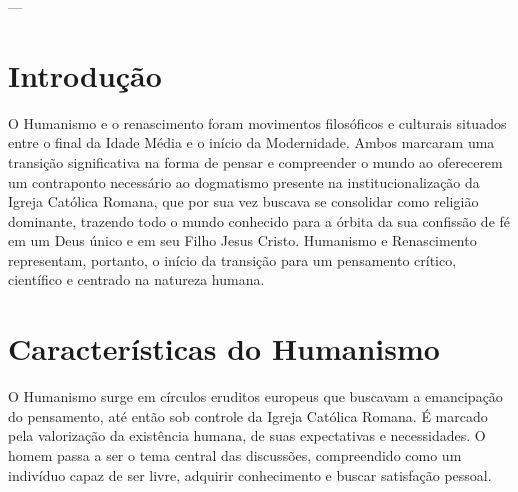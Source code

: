 \documentclass[
    article,            %
	12pt,				%
	oneside,			%
	a4paper,			%
	chapter=TITLE,		%
	section=TITLE,		%
	subsection=TITLE,	%
	english,			%
	french,				%
	spanish,			%
	brazil				%
	]{abntex2}
\begin{document}



\imprimircapa

\imprimirfolhaderosto

---
\tableofcontents*
\cleardoublepage

\textual
\pagestyle{simple}


\section{Introdução}
O Humanismo e o renascimento foram movimentos filosóficos e culturais situados entre o final da Idade Média e o início da Modernidade. Ambos marcaram uma transição significativa na forma de pensar e compreender o mundo ao oferecerem um contraponto necessário ao dogmatismo presente na institucionalização da Igreja Católica Romana, que por sua vez buscava se consolidar como religião dominante, trazendo todo o mundo conhecido para a órbita da sua confissão de fé em um Deus único e em seu Filho Jesus Cristo. Humanismo e Renascimento representam, portanto, o início da transição para um pensamento crítico, científico e centrado na natureza humana.

\section{Características do Humanismo}
O Humanismo surge em círculos eruditos europeus que buscavam a emancipação do pensamento, até então sob controle da Igreja Católica Romana. É marcado pela valorização da existência humana, de suas expectativas e necessidades. O homem passa a ser o tema central das discussões, compreendido como um indivíduo capaz de ser livre, adquirir conhecimento e buscar satisfação pessoal.
\end{document}
